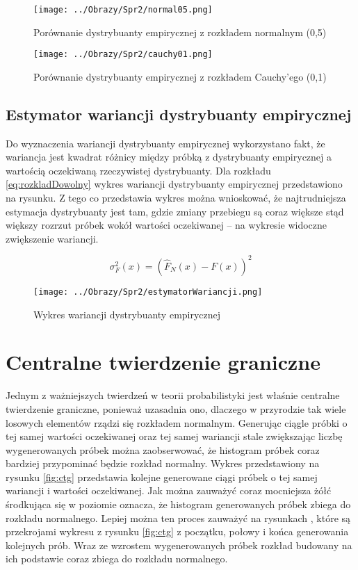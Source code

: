 \documentclass[12pt,a4paper]{article}
\begin{document}
\begin{figure}[H]
\centering
\texttt{[image: ../Obrazy/Spr2/normal05.png]} 
\caption{Porównanie dystrybuanty empirycznej z rozkładem normalnym (0,5)}
\label{fig:normal05}
\end{figure}

\begin{figure}[H]
\centering
\texttt{[image: ../Obrazy/Spr2/cauchy01.png]} 
\caption{Porównanie dystrybuanty empirycznej z rozkładem Cauchy'ego (0,1)}
\label{fig:cauchy01}
\end{figure}

\subsection{Estymator wariancji dystrybuanty empirycznej}
Do wyznaczenia wariancji dystrybuanty empirycznej wykorzystano fakt, że wariancja jest kwadrat różnicy między próbką z dystrybuanty empirycznej a wartością oczekiwaną rzeczywistej dystrybuanty.
Dla rozkładu \ref{eq:rozkladDowolny} wykres wariancji dystrybuanty empirycznej przedstawiono na rysunku.
Z tego co przedstawia wykres można wnioskować, że najtrudniejsza estymacja dystrybuanty jest tam, gdzie zmiany przebiegu są coraz większe stąd większy rozrzut próbek wokół wartości oczekiwanej -- na wykresie widoczne zwiększenie wariancji.


\begin{equation}\label{eq:wariancja}
\sigma^{2}_{F}(x) = (\hat{F}_{N}(x)-F(x))^{2}
\end{equation}

\begin{figure}[H]
\centering
\texttt{[image: ../Obrazy/Spr2/estymatorWariancji.png]} 
\caption{Wykres wariancji dystrybuanty empirycznej}
\label{fig:wariancja}
\end{figure}



\section{Centralne twierdzenie graniczne}
Jednym z ważniejszych twierdzeń w teorii probabilistyki jest właśnie centralne twierdzenie graniczne, ponieważ uzasadnia ono, dlaczego w przyrodzie tak wiele losowych elementów rządzi się rozkładem normalnym.
Generując ciągle próbki o tej samej wartości oczekiwanej oraz tej samej wariancji stale zwiększając liczbę wygenerowanych próbek można zaobserwować, że histogram próbek coraz bardziej przypominać będzie rozkład normalny.
Wykres przedstawiony na rysunku \ref{fig:ctg} przedstawia kolejne generowane ciągi próbek o tej samej wariancji i wartości oczekiwanej. 
Jak można zauważyć coraz mocniejsza żółć środkująca się w poziomie oznacza, że histogram generowanych próbek zbiega do rozkładu normalnego.
Lepiej można ten proces zauważyć na rysunkach , które są przekrojami wykresu z rysunku \ref{fig:ctg} z początku, połowy i końca generowania kolejnych prób.
Wraz ze wzrostem wygenerowanych próbek rozkład budowany na ich podstawie coraz zbiega do rozkładu normalnego.
\end{document}
